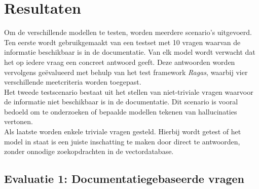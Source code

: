 
\chapter{Resultaten}
\label{ch:resultaten}




Om de verschillende modellen te testen, worden meerdere scenario’s uitgevoerd.
Ten eerste wordt gebruikgemaakt van een testset met 10 vragen waarvan de informatie beschikbaar is in de documentatie. Van elk model wordt verwacht dat het op iedere vraag een concreet antwoord geeft. Deze antwoorden worden vervolgens geëvalueerd met behulp van het test framework \textit{Ragas}, waarbij vier verschillende meetcriteria worden toegepast.
\\[1em]
Het tweede testscenario bestaat uit het stellen van niet-triviale vragen waarvoor de informatie niet beschikbaar is in de documentatie. Dit scenario is vooral bedoeld om te onderzoeken of bepaalde modellen tekenen van hallucinaties vertonen.
\\[1em]
Als laatste worden enkele triviale vragen gesteld. Hierbij wordt getest of het model in staat is een juiste inschatting te maken door direct te antwoorden, zonder onnodige zoekopdrachten in de vectordatabase.

\section{Evaluatie 1: Documentatiegebaseerde vragen}

